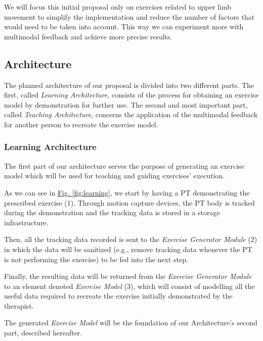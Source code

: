 We will focus this initial proposal only on exercises related to upper limb movement to simplify the implementation and reduce the number of factors that would need to be taken into account. This way we can experiment more with multimodal feedback and achieve more precise results.


\subsection{Architecture}
\label{section-approach-architecture}

The planned architecture of our proposal is divided into two different parts. 
The first, called \emph{Learning Architecture}, consists of the process for obtaining an exercise model by demonstration for further use.
The second and most important part, called \emph{Teaching Architecture}, concerns the application of the multimodal feedback for another person to recreate the exercise model.


\subsubsection{Learning Architecture}

The first part of our architecture serves the purpose of generating an exercise model which will be used for teaching and guiding exercises' execution.

As we can see in \hyperref[fig:learning]{Fig. \ref{fig:learning}}, we start by having a \ac{PT} demonstrating the prescribed exercise (1). Through motion capture devices, the \ac{PT} body is tracked during the demonstration and the tracking data is stored in a storage infrastructure.

Then, all the tracking data recorded is sent to the \emph{Exercise Generator Module} (2) in which the data will be sanitized (e.g., remove tracking data whenever the \ac{PT} is not performing the exercise) to be fed into the next step.

Finally, the resulting data will be returned from the \emph{Exercise Generator Module} to an element denoted \emph{Exercise Model} (3), which will consist of modelling all the useful data required to recreate the exercise initially demonstrated by the therapist. 

The generated \emph{Exercise Model} will be the foundation of our Architecture's second part, described hereafter.



